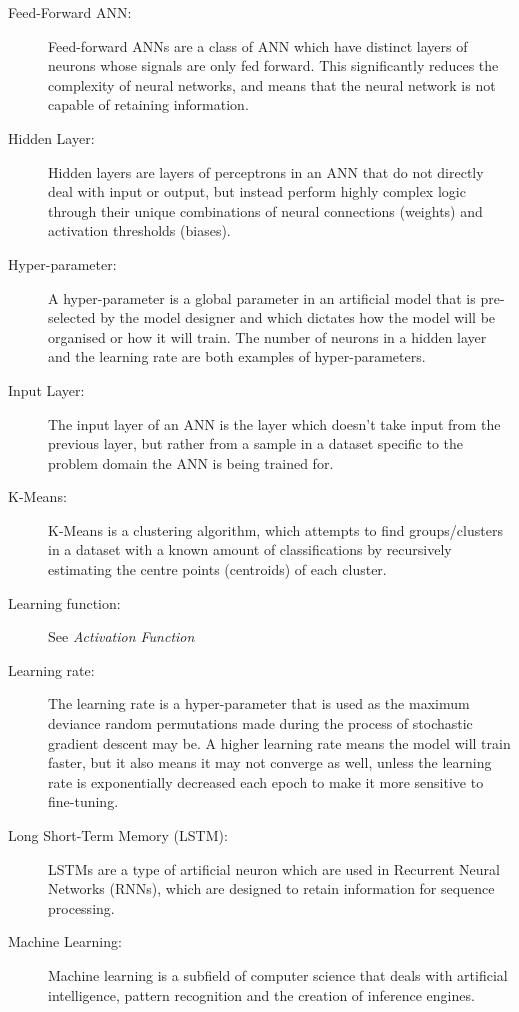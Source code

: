 \documentclass[]{report}
\begin{document}
\begin{description}
\item[Feed-Forward ANN:] Feed-forward ANNs are a class of ANN which have distinct layers of neurons whose signals are only fed forward. This significantly reduces the complexity of neural networks, and means that the neural network is not capable of retaining information.

\item[Hidden Layer:] Hidden layers are layers of perceptrons in an ANN that do not directly deal with input or output, but instead perform highly complex logic through their unique combinations of neural connections (weights) and activation thresholds (biases).

\item[Hyper-parameter:] A hyper-parameter is a global parameter in an artificial model that is pre-selected by the model designer and which dictates how the model will be organised or how it will train. The number of neurons in a hidden layer and the learning rate are both examples of hyper-parameters.

\item[Input Layer:] The input layer of an ANN is the layer which doesn't take input from the previous layer, but rather from a sample in a dataset specific to the problem domain the ANN is being trained for.

\item[K-Means:] K-Means is a clustering algorithm, which attempts to find groups/clusters in a dataset with a known amount of classifications by recursively estimating the centre points (centroids) of each cluster.

\item[Learning function:] See \textit{Activation Function}

\item[Learning rate:] The learning rate is a hyper-parameter that is used as the maximum deviance random permutations made during the process of stochastic gradient descent may be. A higher learning rate means the model will train faster, but it also means it may not converge as well, unless the learning rate is exponentially decreased each epoch to make it more sensitive to fine-tuning.

\item[Long Short-Term Memory (LSTM):] LSTMs are a type of artificial neuron which are used in Recurrent Neural Networks (RNNs), which are designed to retain information for sequence processing.

\item[Machine Learning:] Machine learning is a subfield of computer science that deals with artificial intelligence, pattern recognition and the creation of inference engines.


\end{description}
\end{document}
